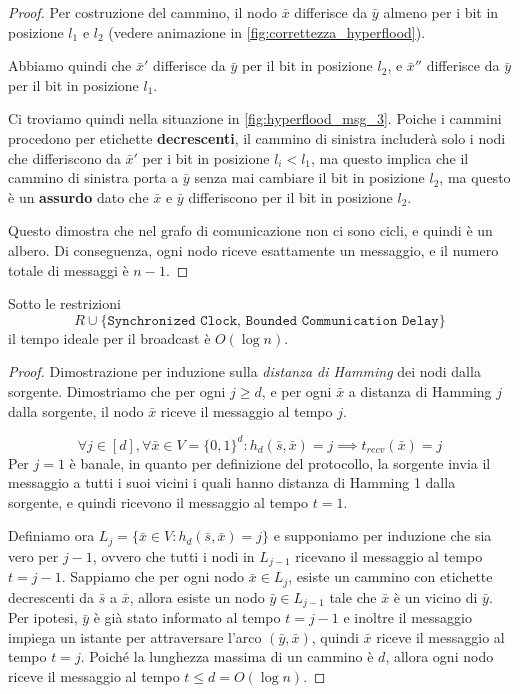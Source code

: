\begin{teorema}
\begin{proof}
        Per costruzione del cammino, il nodo $\bar{x}$ differisce da $\bar{y}$ almeno per i bit in posizione $l_1$ e $l_2$ (vedere animazione in \autoref{fig:correttezza_hyperflood}).

        Abbiamo quindi che $\bar{x}'$ differisce da $\bar{y}$ per il bit in posizione $l_2$, e $\bar{x}''$ differisce da $\bar{y}$ per il bit in posizione $l_1$. 

        Ci troviamo quindi nella situazione in \autoref{fig:hyperflood_msg_3}. Poiche i cammini procedono per etichette \textbf{decrescenti}, il cammino di sinistra includerà solo i nodi che differiscono da $\bar{x}'$ per i bit in posizione $l_i < l_1$, ma questo implica che il cammino di sinistra porta a $\bar{y}$ senza mai cambiare il bit in posizione $l_2$, ma questo è un \textbf{assurdo} dato che $\bar{x}$ e $\bar{y}$ differiscono per il bit in posizione $l_2$.

        Questo dimostra che nel grafo di comunicazione non ci sono cicli, e quindi è un albero. Di conseguenza, ogni nodo riceve esattamente un messaggio, e il numero totale di messaggi è $n - 1$.
    \end{proof}
\end{teorema}

\begin{teorema}
    Sotto le restrizioni 
    \[
    R \cup \{\texttt{Synchronized Clock, Bounded Communication Delay}\}
    \]
    il tempo ideale per il broadcast è $O(\log n)$.
    \begin{proof}
        Dimostrazione per induzione sulla \textit{distanza di Hamming} dei nodi dalla sorgente. Dimostriamo che per ogni $j \geq d$, e per ogni $\bar{x}$ a distanza di Hamming $j$ dalla sorgente, il nodo $\bar{x}$ riceve il messaggio al tempo $j$.

        \[
            \forall j \in [d], \forall \bar{x} \in V = \{0, 1\}^d: h_d(\bar{s}, \bar{x}) = j \implies t_{recv}(\bar{x}) = j
        \]
        Per $j = 1$ è banale, in quanto per definizione del protocollo, la sorgente invia il messaggio a tutti i suoi vicini i quali hanno distanza di Hamming 1 dalla sorgente, e quindi ricevono il messaggio al tempo $t = 1$.

        Definiamo ora $L_j = \{ \bar{x} \in V : h_d(\bar{s}, \bar{x}) = j \}$ e supponiamo per induzione che sia vero per $j - 1$, ovvero che tutti i nodi in $L_{j-1}$ ricevano il messaggio al tempo $t = j - 1$. Sappiamo che per ogni nodo $\bar{x} \in L_j$, esiste un cammino con etichette decrescenti da $\bar{s}$ a $\bar{x}$, allora esiste un nodo $\bar{y} \in L_{j-1}$ tale che $\bar{x}$ è un vicino di $\bar{y}$. Per ipotesi, $\bar{y}$ è già stato informato al tempo $t = j - 1$ e inoltre il messaggio impiega un istante per attraversare l'arco $(\bar{y}, \bar{x})$, quindi $\bar{x}$ riceve il messaggio al tempo $t = j$. 
        Poiché la lunghezza massima di un cammino è $d$, allora ogni nodo riceve il messaggio al tempo $t \leq d = O(\log n)$.
    \end{proof}
\end{teorema}